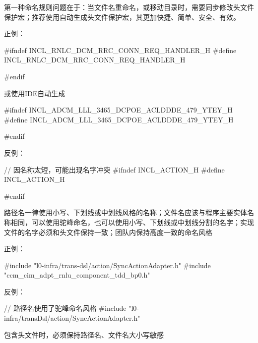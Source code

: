 \begin{content}
第一种命名规则问题在于：当文件名重命名，或移动目录时，需要同步修改头文件保护宏；推荐使用自动生成头文件保护宏，其更加快捷、简单、安全、有效。

正例：
\begin{leftbar}
\begin{c++}
#ifndef INCL_RNLC_DCM_RRC_CONN_REQ_HANDLER_H
#define INCL_RNLC_DCM_RRC_CONN_REQ_HANDLER_H

#endif
\end{c++}
\end{leftbar}

或使用IDE自动生成

\begin{leftbar}
\begin{c++}
#ifndef INCL_ADCM_LLL_3465_DCPOE_ACLDDDE_479_YTEY_H
#define INCL_ADCM_LLL_3465_DCPOE_ACLDDDE_479_YTEY_H

#endif
\end{c++}
\end{leftbar}

反例：
\begin{leftbar}
\begin{c++}
// 因名称太短，可能出现名字冲突
#ifndef INCL_ACTION_H
#define INCL_ACTION_H

#endif
\end{c++}
\end{leftbar}

\begin{regulation}
路径名一律使用小写、下划线或中划线风格的名称；文件名应该与程序主要实体名称相同，可以使用驼峰命名，也可以使用小写、下划线或中划线分割的名字；实现文件的名字必须和头文件保持一致；团队内保持高度一致的命名风格
\end{regulation}

正例：
\begin{leftbar}
\begin{c++}
#include "l0-infra/trans-dsl/action/SyncActionAdapter.h"
#include "ccm_cim_adpt_rnlu_component_tdd_bp0.h"
\end{c++}
\end{leftbar}

反例：
\begin{leftbar}
\begin{c++}
// 路径名使用了驼峰命名风格
#include "l0-infra/transDsl/action/SyncActionAdapter.h"
\end{c++}
\end{leftbar}

\begin{regulation}
包含头文件时，必须保持路径名、文件名大小写敏感
\end{regulation}


\end{content}
